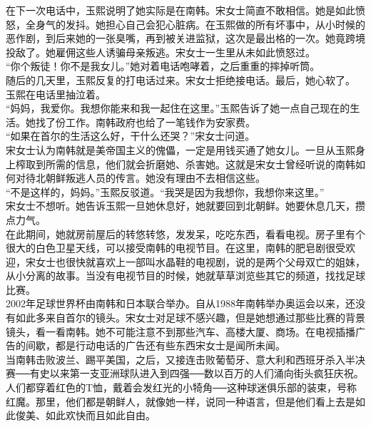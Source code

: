 \begin{multicols}{\theparacolNo}
在下一次电话中，玉熙说明了她实际是在南韩。宋女士简直不敢相信。她是如此愤怒，全身气的发抖。她担心自己会犯心脏病。在玉熙做的所有坏事中，从小时候的恶作剧，到后来她的一张臭嘴，再到被关进监狱，这次是最出格的一次。她竟跨境投敌了。她雇佣这些人诱骗母亲叛逃。宋女士一生里从未如此愤怒过。\\

“你个叛徒！你不是我女儿。”她对着电话咆哮着，之后重重的摔掉听筒。\\

随后的几天里，玉熙反复的打电话过来。宋女士拒绝接电话。最后，她心软了。\\

玉熙在电话里抽泣着。\\

“妈妈，我爱你。我想你能来和我一起住在这里。”玉熙告诉了她一点自己现在的生活。她找了份工作。南韩政府也给了一笔钱作为安家费。\\

“如果在首尔的生活这么好，干什么还哭？”宋女士问道。\\

宋女士认为南韩就是美帝国主义的傀儡，一定是用钱买通了她女儿。一旦从玉熙身上榨取到所需的信息，他们就会折磨她、杀害她。这就是宋女士曾经听说的南韩如何对待北朝鲜叛逃人员的传言。她没有理由不去相信这些。\\

“不是这样的，妈妈。”玉熙反驳道。“我哭是因为我想你，我想你来这里。”\\

宋女士不想听。她告诉玉熙一旦她休息好，她就要回到北朝鲜。她要休息几天，攒点力气。\\

在此期间，她就房前屋后的转悠转悠，发发呆，吃吃东西，看看电视。房子里有个很大的白色卫星天线，可以接受南韩的电视节目。在这里，南韩的肥皂剧很受欢迎，宋女士也很快就喜欢上一部叫水晶鞋的电视剧，说的是两个父母双亡的姐妹，从小分离的故事。当没有电视节目的时候，她就草草浏览些其它的频道，找找足球比赛。\\

2002年足球世界杯由南韩和日本联合举办。自从1988年南韩举办奥运会以来，还没有如此多来自首尔的镜头。宋女士对足球不感兴趣，但是她想通过那些比赛的背景镜头，看一看南韩。她不可能注意不到那些汽车、高楼大厦、商场。在电视插播广告的间歇，都是行动电话的广告还有些东西宋女士是闻所未闻。\\

当南韩击败波兰、踢平美国，之后，又接连击败葡萄牙、意大利和西班牙杀入半决赛──有史以来第一支亚洲球队进入到四强──数以百万的人们涌向街头疯狂庆祝。人们都穿着红色的T恤，戴着会发红光的小犄角──这种球迷俱乐部的装束，号称红魔。那里，他们都是朝鲜人，就像她一样，说同一种语言，但是他们看上去是如此俊美、如此欢快而且如此自由。\\


\end{multicols}
